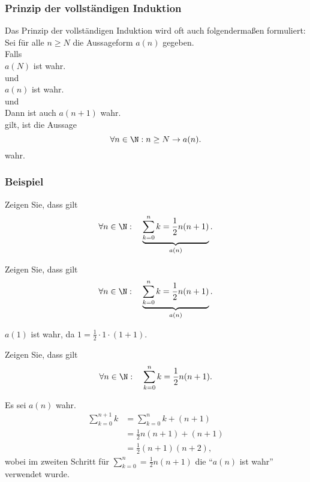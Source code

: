 %
%
\begin{frame}\frametitle{Prinzip der vollständigen Induktion}
	
	Das Prinzip der vollständigen Induktion wird oft auch folgenderma{\ss}en formuliert:\\
	\vfill
	Sei für alle $n\geq N$ die Aussageform $a(n)$ gegeben.\\[1mm]
	
	Falls\\[1mm]
	
	 $a(N)$ ist wahr.\\[1mm]  
	und\\[1mm]
	 $a(n)$ ist wahr.\\[1mm]  
	und\\[1mm]
	 Dann ist auch $a(n+1)$ wahr.\\[1mm]
	
	gilt, ist die Aussage 
	$$
		\forall n\in \N: n\geq N \rightarrow a(n).
	$$	
	wahr.
	
\end{frame}
%
%
\begin{frame}\frametitle{Beispiel}
	
	Zeigen Sie, dass gilt
	$$
		\forall n\in \N:\quad  \underbrace{\sum_{k=0}^n k = \frac{1}{2}n(n+1)}_{a(n)}.
	$$	
	
\end{frame}
%
%
\begin{frame}
	
	Zeigen Sie, dass gilt
	$$
		\forall n\in \N:\quad  \underbrace{\sum_{k=0}^n k = \frac{1}{2}n(n+1)}_{a(n)}.
	$$	
	
	 $a(1)$ ist wahr, da $1 = \frac{1}{2}\cdot 1 \cdot (1+1)$.
	
\end{frame}
%
%
\begin{frame}

	Zeigen Sie, dass gilt
	$$
		\forall n\in \N:\quad  \sum_{k=0}^n k = \frac{1}{2}n(n+1).
	$$	
	
	 Es sei $a(n)$ wahr. \\\pause
	\begin{align*}
		\sum_{k=0}^{n+1} k	&= \sum_{k=0}^{n}k + (n+1)\\
						&=  \frac{1}{2}n(n+1) + (n+1)\\
						&=  \frac{1}{2}(n+1)(n+2),
	\end{align*}
	wobei im zweiten Schritt für  $\sum_{k=0}^{n} =  \frac{1}{2}n(n+1)$ die  
	``$a(n)$ ist wahr'' verwendet wurde.

	
\end{frame}
